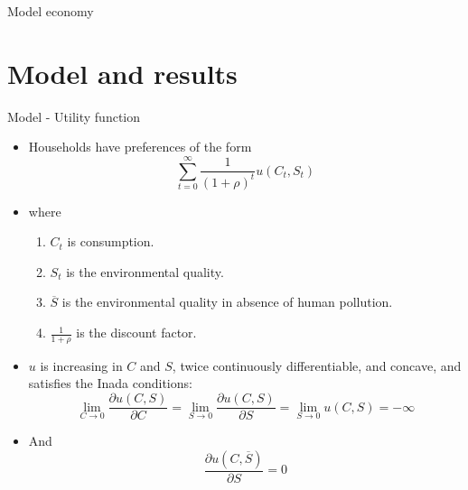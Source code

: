 \documentclass[aspectratio=169,xcolor=dvipsnames]{beamer}
\begin{document}
\begin{frame}{}
\centering
\Large Model economy 
\end{frame}

\section{Model and results}
\begin{frame}{Model - Utility function}
    \begin{itemize}
\item Households have preferences of the form
        \begin{equation}
            \sum_{t=0}^\infty \frac{1}{(1+\rho)^t} u(C_t, S_t)
        \end{equation}
\item where
        \begin{enumerate}
\item $C_t$ is consumption.
\item $S_t$ is the environmental quality.
\item $\overline{S}$ is the environmental quality in absence of human pollution.
\item $\frac{1}{1+\rho}$ is the discount factor.
        \end{enumerate}
\item $u$ is increasing in $C$ and $S$, twice continuously differentiable, and concave, and satisfies the Inada conditions:
    \begin{equation}
    \lim_{C \rightarrow0}\frac{\partial u(C,S)}{\partial C}= \lim_{S \rightarrow0}\frac{\partial u(C,S)}{\partial S} = \lim_{S \rightarrow 0} u(C,S)= -\infty
    \end{equation}
\item And 
    \begin{equation}
        \frac{\partial u(C,\overline{S})}{\partial S}=0
    \end{equation}
    \end{itemize}
\end{frame}
\end{document}
